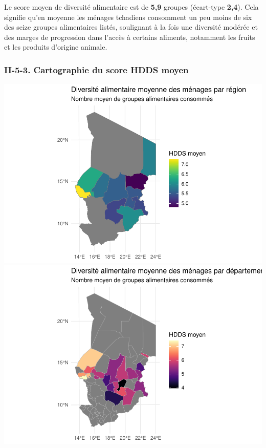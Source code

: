 \documentclass[
]{article}
\begin{document}
Le score moyen de diversité alimentaire est de \textbf{5,9} groupes
(écart-type \textbf{2,4}). Cela signifie qu'en moyenne les ménages
tchadiens consomment un peu moins de six des seize groupes alimentaires
listés, soulignant à la fois une diversité modérée et des marges de
progression dans l'accès à certains aliments, notamment les fruits et
les produits d'origine animale.

\hypertarget{ii-5-3.-cartographie-du-score-hdds-moyen}{%
\subsubsection{II-5-3. Cartographie du score HDDS
moyen}\label{ii-5-3.-cartographie-du-score-hdds-moyen}}

\includegraphics{Rapport_PAN_files/figure-latex/hdds_map-1.pdf}
\includegraphics{Rapport_PAN_files/figure-latex/hdds_map-2.pdf}
\end{document}

